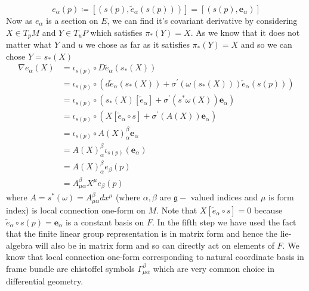 \documentclass[12pt]{article}
\begin{document}
\begin{equation*}
    e_{\alpha}(p) \coloneqq [(s(p), \tilde{e}_{\alpha}(s(p)))] = [(s(p), \mathbf{e}_{\alpha})]
\end{equation*} Now as $e_{\alpha}$ is a section on $E$, we can find it's covariant derivative by considering $X\in T_{p}M$ and $Y\in T_{u}P$ which satisfies $\pi_{\ast}(Y) = X$. As we know that it does not matter what $Y$ and $u$ we chose as far as it satisfies $\pi_{\ast}(Y) = X$ and so we can chose $Y = s_{\ast}(X)$
\begin{align*}
    \nabla e_{\alpha}(X) &= \iota_{s(p)}\circ D\tilde{e}_{\alpha}(s_{\ast}(X)) \\
                         &= \iota_{s(p)}\circ(d\tilde{e}_{\alpha}(s_{\ast}(X)) + \sigma^{\prime}(\omega(s_{\ast}(X)))\tilde{e}_{\alpha}(s(p))) \\
                         &= \iota_{s(p)}\circ(s_{\ast}(X)[\tilde{e}_{\alpha}] + \sigma^{\prime}(s^{\ast}\omega(X))\mathbf{e}_{\alpha}) \\
                         &= \iota_{s(p)}\circ(X[\tilde{e}_{\alpha}\circ s] + \sigma^{\prime}(A(X))\mathbf{e}_{\alpha}) \\
                         &= \iota_{s(p)}\circ A(X)^{\beta}_{\alpha}\mathbf{e}_{\alpha} \\
                         &= A(X)^{\beta}_{\alpha}\iota_{s(p)}(\mathbf{e}_{\alpha}) \\
                         &= A(X)^{\beta}_{\alpha}e_{\beta}(p) \\
                         &= A^{\beta}_{\mu\alpha}X^{\mu}e_{\beta}(p)
\end{align*} where $A = s^{\ast}(\omega) = A^{\beta}_{\mu\alpha}dx^{\mu}$ (where $\alpha, \beta$ are $\mathfrak{g}-$ valued indices and $\mu$ is form index) is local connection one-form on $M$. Note that $X[\tilde{e}_{\alpha}\circ s] = 0 $ because $\tilde{e}_{\alpha}\circ s(p) = \mathbf{e}_{\alpha}$ is a constant basis on $F$. In the fifth step we have used the fact that the finite linear group representation is in matrix form and hence the lie-algebra will also be in matrix form and so can directly
act on elements of $F$. We know that local connection one-form corresponding to natural coordinate basis in frame bundle are chistoffel symbols $\Gamma^{\beta}_{\mu\alpha}$ which are very common choice in differential geometry.
\end{document}
